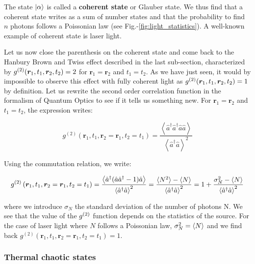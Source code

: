 \noindent The state $\ket{\alpha}$ is called a \textbf{coherent state} or Glauber state. We thus find that a coherent state writes as a sum of number states and that the probability to find $n$ photons follows a Poissonian law (see Fig.-\ref{fig:light_statistics}). A well-known example of coherent state is laser light.

Let us now close the parenthesis on the coherent state and come back to the Hanbury Brown and Twiss effect described in the last sub-section, characterized by $g^{(2)} (\bm{r}_1, t_1, \bm{r}_2, t_2) = 2$ for $\bm{r}_1 = \bm{r}_2$ and $t_1=t_2$. As we have just seen, it would by impossible to observe this effect with fully coherent light as $g^{(2)} (\bm{r}_1, t_1, \bm{r}_2, t_2) = 1$ by definition. Let us rewrite the second order correlation function in the formalism of Quantum Optics to see if it tells us something new. For $\bm{r}_1 = \bm{r}_2$ and $t_1=t_2$, the expression writes: 

\begin{equation}
     g^{(2)}\left(\bm{r}_{1}, t_{1}, \bm{r}_{2}=\bm{r}_1, t_{2}=t_1\right) = \frac{\left\langle\hat{a}^{\dagger} \hat{a}^{\dagger} \hat{a} \hat{a}\right\rangle} {\left\langle\hat{a}^{\dagger} \hat{a}\right\rangle^{2}}
\end{equation}

\noindent Using the commutation relation, we write:

\begin{equation}
    g^{(2)}\left(\bm{r}_{1}, t_{1}, \bm{r}_{2}=\bm{r}_1, t_{2}=t_1\right) = \frac{\left\langle\hat{a}^{\dagger} ( \hat{a} \hat{a}^{\dagger}-1) \hat{a} \right\rangle} {\left\langle\hat{a}^{\dagger} \hat{a}\right\rangle^{2}} = \frac{\langle N^2\rangle-\langle N\rangle}{\left\langle\hat{a}^{\dagger} \hat{a}\right\rangle^{2}}  = 1 +  \frac{\sigma^2_N-\langle N\rangle}{\left\langle\hat{a}^{\dagger} \hat{a}\right\rangle^{2}}
    \label{eq:g2_variance}
\end{equation}

\noindent where we introduce $\sigma_N$ the standard deviation of the number of photons N. We see that the value of the $g^{(2)}$ function depends on the statistics of the source. For the case of laser light where $N$ follows a Poissonian law, $\sigma_N^2 = \langle N\rangle$ and we find back $g^{(2)}\left(\bm{r}_{1}, t_{1}, \bm{r}_{2}=\bm{r}_1, t_{2}=t_1\right) = 1$.

\subsubsection{Thermal chaotic states}

